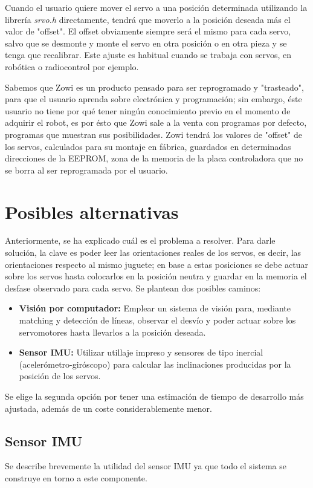 Cuando el usuario quiere mover el servo a una posición determinada utilizando la librería \textit{srvo.h} directamente, tendrá que moverlo a la posición deseada más el valor de "offset". El offset obviamente siempre será el mismo para cada servo, salvo que se desmonte y monte el servo en otra posición o en otra pieza y se tenga que recalibrar. Este ajuste es habitual cuando se trabaja con servos, en robótica o radiocontrol por ejemplo.

Sabemos que Zowi es un producto pensado para ser reprogramado y "trasteado", para que el usuario aprenda sobre electrónica y programación; sin embargo, éste usuario no tiene por qué tener ningún conocimiento previo en el momento de adquirir el robot, es por ésto que Zowi sale a la venta con programas por defecto, programas que muestran sus posibilidades. Zowi tendrá los valores de "offset" de los servos, calculados para su montaje en fábrica, guardados en determinadas direcciones de la EEPROM, zona de la memoria de la placa controladora que no se borra al ser reprogramada por el usuario.

\section{Posibles alternativas}

Anteriormente, se ha explicado cuál es el problema a resolver. Para darle solución, la clave es poder leer las orientaciones reales de los servos, es decir, las orientaciones respecto al mismo juguete; en base a estas posiciones se debe actuar sobre los servos hasta colocarlos en la posición neutra y guardar en la memoria el desfase observado para cada servo. Se plantean dos posibles caminos:

\begin{itemize}
  \item \textbf{Visión por computador:} Emplear un sistema de visión para, mediante matching y detección de líneas, observar el desvío y poder actuar sobre los servomotores hasta llevarlos a la posición deseada.
  \item \textbf{Sensor IMU:} Utilizar utillaje impreso y sensores de tipo inercial (acelerómetro-giróscopo) para calcular las inclinaciones producidas por la posición de los servos.
\end{itemize}

Se elige la segunda opción por tener una estimación de tiempo de desarrollo más ajustada, además de un coste considerablemente menor.

\subsection{Sensor IMU}
Se describe brevemente la utilidad del sensor IMU ya que todo el sistema se construye en torno a este componente.

